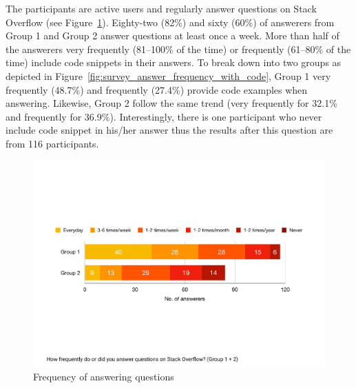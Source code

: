 \documentclass{svjour3}                     %
\begin{document}
The participants are active users and regularly answer questions on Stack
Overflow (see Figure~\ref{fig:survey_answer_frequency}). Eighty-two (82\%) and
sixty (60\%) of answerers from Group 1 and Group 2  answer questions at least
once a week. More than half of the answerers very frequently (81--100\% of the
time) or frequently (61--80\% of the time) include code snippets in their
answers. To break down into two groups as depicted in
Figure~\ref{fig:survey_answer_frequency_with_code}, Group 1 very frequently
(48.7\%) and frequently (27.4\%) provide code examples when answering. Likewise,
Group 2 follow the same trend (very frequently for 32.1\% and frequently for
36.9\%). Interestingly, there is one participant who never include code snippet
in his/her answer thus the results after this question are from 116 participants.


\begin{figure}
		\centering
		\includegraphics[width=0.8\linewidth]{survey_answer_frequency}
		\caption{Frequency of answering questions}
		\label{fig:survey_answer_frequency}
\end{figure}

\end{document}
